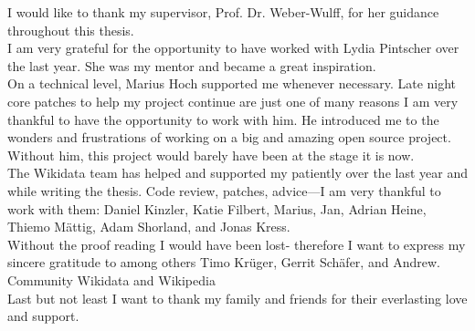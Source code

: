 I would like to thank my supervisor, Prof. Dr. Weber-Wulff, for her guidance throughout this thesis. \\

I am very grateful for the opportunity to have worked with Lydia Pintscher over the last year. She was my mentor and became a great inspiration. \\

On a technical level, Marius Hoch supported me whenever necessary. Late night core patches to help my project continue are just one of many reasons I am very thankful to have the opportunity to work with him. He introduced me to the wonders and frustrations of working on a big and amazing open source project. Without him, this project would barely have been at the stage it is now. \\

The Wikidata team has helped and supported my patiently over the last year and while writing the thesis. Code review, patches, advice---I am very thankful to work with them: Daniel Kinzler, Katie Filbert, Marius, Jan, Adrian Heine, Thiemo Mättig, Adam Shorland, and Jonas Kress.  \\

Without the proof reading I would have been lost- therefore I want to express my sincere gratitude to among others Timo Krüger, Gerrit Schäfer, and Andrew. \\

Community Wikidata and Wikipedia\\

Last but not least I want to thank my family and friends for their everlasting love and support.